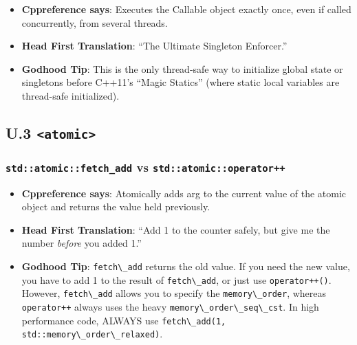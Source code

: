 \begin{itemize}
\tightlist
\item
  \textbf{Cppreference says}: Executes the Callable object exactly once,
  even if called concurrently, from several threads.
\item
  \textbf{Head First Translation}: ``The Ultimate Singleton Enforcer.''
\item
  \textbf{Godhood Tip}: This is the only thread-safe way to initialize
  global state or singletons before C++11's ``Magic Statics'' (where
  static local variables are thread-safe initialized).
\end{itemize}

\hypertarget{u.3-atomic}{%
\subsection{\texorpdfstring{U.3
\texttt{\textless{}atomic\textgreater{}}}{U.3 \textless atomic\textgreater{}}}\label{u.3-atomic}}

\hypertarget{stdatomicfetch_add-vs-stdatomicoperator}{%
\subsubsection{\texorpdfstring{\texttt{std::atomic::fetch\_add} vs
\texttt{std::atomic::operator++}}{std::atomic::fetch\_add vs std::atomic::operator++}}\label{stdatomicfetch_add-vs-stdatomicoperator}}

\begin{itemize}
\tightlist
\item
  \textbf{Cppreference says}: Atomically adds arg to the current value
  of the atomic object and returns the value held previously.
\item
  \textbf{Head First Translation}: ``Add 1 to the counter safely, but
  give me the number \emph{before} you added 1.''
\item
  \textbf{Godhood Tip}: \passthrough{\lstinline!fetch\_add!} returns the
  old value. If you need the new value, you have to add 1 to the result
  of \passthrough{\lstinline!fetch\_add!}, or just use
  \passthrough{\lstinline!operator++()!}. However,
  \passthrough{\lstinline!fetch\_add!} allows you to specify the
  \passthrough{\lstinline!memory\_order!}, whereas
  \passthrough{\lstinline!operator++!} always uses the heavy
  \passthrough{\lstinline!memory\_order\_seq\_cst!}. In high performance
  code, ALWAYS use
  \passthrough{\lstinline!fetch\_add(1, std::memory\_order\_relaxed)!}.
\end{itemize}

